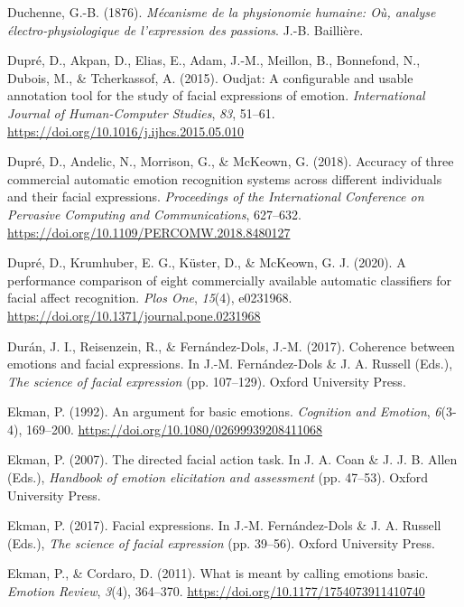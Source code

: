 \documentclass[
  english,
  doc]{apa7}
\newlength{\cslhangindent}
\newenvironment{cslreferences}%
  {\setlength{\parindent}{0pt}%
  \everypar{\setlength{\hangindent}{\cslhangindent}}\ignorespaces}%
  {\par}
\begin{document}
\begin{cslreferences}
\leavevmode\hypertarget{ref-duchenne1876mecanisme}{}%
Duchenne, G.-B. (1876). \emph{Mécanisme de la physionomie humaine: Où, analyse électro-physiologique de l'expression des passions}. J.-B. Baillière.

\leavevmode\hypertarget{ref-dupre2015oudjat}{}%
Dupré, D., Akpan, D., Elias, E., Adam, J.-M., Meillon, B., Bonnefond, N., Dubois, M., \& Tcherkassof, A. (2015). Oudjat: A configurable and usable annotation tool for the study of facial expressions of emotion. \emph{International Journal of Human-Computer Studies}, \emph{83}, 51--61. \url{https://doi.org/10.1016/j.ijhcs.2015.05.010}

\leavevmode\hypertarget{ref-dupre2018accuracy}{}%
Dupré, D., Andelic, N., Morrison, G., \& McKeown, G. (2018). Accuracy of three commercial automatic emotion recognition systems across different individuals and their facial expressions. \emph{Proceedings of the International Conference on Pervasive Computing and Communications}, 627--632. \url{https://doi.org/10.1109/PERCOMW.2018.8480127}

\leavevmode\hypertarget{ref-dupre2020performance}{}%
Dupré, D., Krumhuber, E. G., Küster, D., \& McKeown, G. J. (2020). A performance comparison of eight commercially available automatic classifiers for facial affect recognition. \emph{Plos One}, \emph{15}(4), e0231968. \url{https://doi.org/10.1371/journal.pone.0231968}

\leavevmode\hypertarget{ref-duran2017coherence}{}%
Durán, J. I., Reisenzein, R., \& Fernández-Dols, J.-M. (2017). Coherence between emotions and facial expressions. In J.-M. Fernández-Dols \& J. A. Russell (Eds.), \emph{The science of facial expression} (pp. 107--129). Oxford University Press.

\leavevmode\hypertarget{ref-ekman1992argument}{}%
Ekman, P. (1992). An argument for basic emotions. \emph{Cognition and Emotion}, \emph{6}(3-4), 169--200. \url{https://doi.org/10.1080/02699939208411068}

\leavevmode\hypertarget{ref-ekman2007directed}{}%
Ekman, P. (2007). The directed facial action task. In J. A. Coan \& J. J. B. Allen (Eds.), \emph{Handbook of emotion elicitation and assessment} (pp. 47--53). Oxford University Press.

\leavevmode\hypertarget{ref-ekman2017facial}{}%
Ekman, P. (2017). Facial expressions. In J.-M. Fernández-Dols \& J. A. Russell (Eds.), \emph{The science of facial expression} (pp. 39--56). Oxford University Press.

\leavevmode\hypertarget{ref-ekman2011meant}{}%
Ekman, P., \& Cordaro, D. (2011). What is meant by calling emotions basic. \emph{Emotion Review}, \emph{3}(4), 364--370. \url{https://doi.org/10.1177/1754073911410740}


\end{cslreferences}
\end{document}
